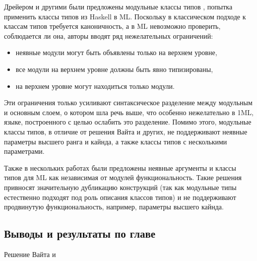 \documentclass[../diploma.tex]{subfiles}
\begin{document}
Дрейером и другими были предложены модульные классы типов \cite{ml_typeclasses}, попытка применить классы типов из Haskell в ML. Поскольку в классическом подходе к классам типов требуется каноничность, а в ML невозможно проверить, соблюдается ли она, авторы вводят ряд нежелательных ограничений:

\begin{itemize}
	\item неявные модули могут быть объявлены только на верхнем уровне,
	\item все модули на верхнем уровне должны быть явно типизированы,
	\item на верхнем уровне могут находиться только модули.
\end{itemize}

Эти ограничения только усиливают синтаксическое разделение между модульным и основным слоем, о котором шла речь выше, что особенно нежелательно в 1ML, языке, построенного с целью ослабить это разделение. Помимо этого, модульные классы типов, в отличие от решения Вайта и других, не поддерживают неявные параметры высшего ранга и кайнда, а также классы типов с несколькими параметрами.

Также в нескольких работах были предложены неявные аргументы \cite{experiments} и классы типов \cite{schneider} для ML как независимая от модулей функциональность. Такие решения привносят значительную дубликацию конструкций (так как модульные типы естественно подходят под роль описания классов типов) и не поддерживают продвинутую функциональность, например, параметры высшего кайнда.

\subsection{Выводы и результаты по главе}

Решение Вайта и 
\end{document}
